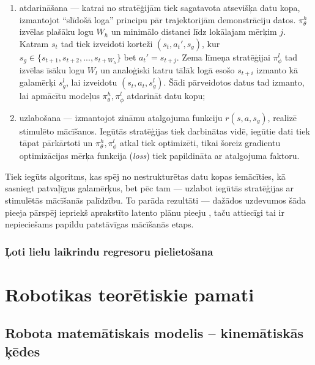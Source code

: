 \documentclass[12pt, a4paper]{article}
\numberwithin{equation}{section} %
\begin{document}
\begin{enumerate}
    \item atdarināšana --- katrai no stratēģijām tiek sagatavota atsevišķa datu kopa, izmantojot ``slīdošā loga'' principu pār trajektorijām demonstrāciju datos. $\pi_{\theta}^h$ izvēlas plašāku logu $W_h$ un minimālo distanci līdz lokālajam mērķim $j$. Katram $s_t $ tad tiek izveidoti korteži $(s_t, a_t', s_g)$, kur $s_g \in \lbrace s_{t+1}, s_{t+2}, ..., s_{t+W_h} \rbrace$ bet $a_t' = s_{t+j}$. Zema līmeņa stratēģijai $\pi_{\phi}^l$ tad izvēlas īsāku logu $W_l$ un analoģiski katru tālāk logā esošo $s_{t+i}$ izmanto kā galamērķi $s_g^l$, lai izveidotu $(s_t, a_t, s_g^l)$. Šādi pārveidotos datus tad izmanto, lai apmācītu modeļus $\pi_{\theta}^h, \pi_{\phi}^l$ atdarināt datu kopu;
    \item uzlabošana --- izmantojot zināmu atalgojuma funkciju $r(s,a,s_g)$, realizē stimulēto mācīšanos. Iegūtās stratēģijas tiek darbinātas vidē, iegūtie dati tiek tāpat pārkārtoti un $\pi_{\theta}^h, \pi_{\phi}^l$ atkal tiek optimizēti, tikai šoreiz gradientu optimizācijas mērķa funkcija (\textit{loss}) tiek papildināta ar atalgojuma faktoru.
\end{enumerate}

Tiek iegūts algoritms, kas spēj no nestrukturētas datu kopas iemācīties, kā sasniegt patvaļīgus galamērķus, bet pēc tam --- uzlabot iegūtās stratēģijas ar stimulētās mācīšanās palīdzību. To parāda rezultāti --- dažādos uzdevumos šāda pieeja pārspēj iepriekš aprakstīto latento plānu pieeju \cite{lynch2020learning}, taču attiecīgi tai ir nepieciešams papildu patstāvīgas mācīšanās etaps.

\subsubsection{Ļoti lielu laikrindu regresoru pielietošana}


%
%
%
%
%
%
%
%
%
%
%
%
%
%
%
%
%
%
%

\newpage
\section{Robotikas teorētiskie pamati}

\subsection{Robota matemātiskais modelis -- kinemātiskās ķēdes}
\end{document}
